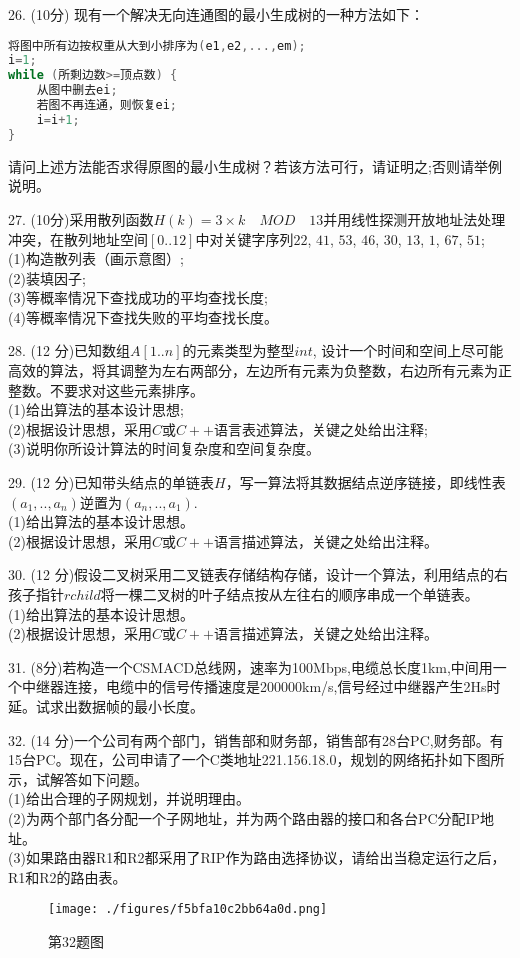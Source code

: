 26. (10分) 现有一个解决无向连通图的最小生成树的一种方法如下： \\
\begin{lstlisting}[language=cpp]
将图中所有边按权重从大到小排序为(e1,e2,...,em);
i=1;
while (所剩边数>=顶点数) {
    从图中删去ei;
    若图不再连通，则恢复ei;
    i=i+1;
}
\end{lstlisting}
请问上述方法能否求得原图的最小生成树？若该方法可行，请证明之;否则请举例说明。

27. (10分)采用散列函数$H(k)=3\times k \quad MOD \quad 13$并用线性探测开放地址法处理冲突，在散列地址空间$[0..12]$中对关键字序列$22$, $41$, $53$, $46$, $30$, $13$, $1$, $67$, $51$; \\
(1)构造散列表（画示意图）; \\
(2)装填因子; \\
(3)等概率情况下查找成功的平均查找长度; \\
(4)等概率情况下查找失败的平均查找长度。

28. (12 分)已知数组$A[1..n]$的元素类型为整型$int$, 设计一个时间和空间上尽可能高效的算法，将其调整为左右两部分，左边所有元素为负整数，右边所有元素为正整数。不要求对这些元素排序。 \\
(1)给出算法的基本设计思想; \\
(2)根据设计思想，采用$C$或$C++$语言表述算法，关键之处给出注释; \\
(3)说明你所设计算法的时间复杂度和空间复杂度。

29. (12 分)已知带头结点的单链表$H$，写一算法将其数据结点逆序链接，即线性表$(a_1,..,a_n)$逆置为$(a_n,..,a_1)$. \\
(1)给出算法的基本设计思想。 \\
(2)根据设计思想，采用$C$或$C++$语言描述算法，关键之处给出注释。

30. (12 分)假设二叉树采用二叉链表存储结构存储，设计一个算法，利用结点的右孩子指针$rchild$将一棵二叉树的叶子结点按从左往右的顺序串成一个单链表。 \\
(1)给出算法的基本设计思想。 \\
(2)根据设计思想，采用$C$或$C++$语言描述算法，关键之处给出注释。

31. (8分)若构造一个CSMACD总线网，速率为100Mbps,电缆总长度1km,中间用一个中继器连接，电缆中的信号传播速度是200000km/s,信号经过中继器产生2Hs时延。试求出数据帧的最小长度。

32. (14 分)一个公司有两个部门，销售部和财务部，销售部有28台PC,财务部。有15台PC。现在，公司申请了一个C类地址221.156.18.0，规划的网络拓扑如下图所示，试解答如下问题。 \\
(1)给出合理的子网规划，并说明理由。 \\
(2)为两个部门各分配一个子网地址，并为两个路由器的接口和各台PC分配IP地址。 \\
(3)如果路由器R1和R2都采用了RIP作为路由选择协议，请给出当稳定运行之后，R1和R2的路由表。
\begin{figure}[ht]
\centering
\texttt{[image: ./figures/f5bfa10c2bb64a0d.png]}
\caption{第32题图} \label{fig_DNCC14_1}
\end{figure}

